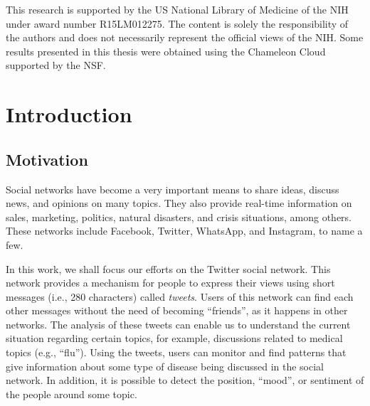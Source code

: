 \documentclass[12pt]{report}
\begin{document}
	This research is supported by the \ac{US} National Library of Medicine of the \ac{NIH} under award number R15LM012275. The content is solely the responsibility of the authors and does not necessarily represent the official views of the \ac{NIH}. Some results presented in this thesis were obtained using the Chameleon Cloud supported by the \ac{NSF}.
	\vfill
	\doublespacing
	
	\tableofcontents{}
	
	\newpage
	\printacronyms[include-classes=abbrev,name=List of Abbreviations]
	\newpage
	\listoffigures{}
	\newpage
	\listoftables{}
	
	\newpage
	
	\fancyhf{}
	\fancyhead[R]{\thepage} 
	\renewcommand{\figurename}{Fig}
	\onehalfspacing
	\chapter{Introduction}\label{Chapter 1}
	\doublespacing
	
	\section{Motivation}
	Social networks have become a very important means to share ideas, discuss news, and opinions on many topics.  They also provide real-time information on sales, marketing, politics, natural disasters, and crisis situations, among others. These networks include Facebook, Twitter, WhatsApp, and Instagram, to name a few. 
	
	In this work, we shall focus our efforts on the Twitter social network. This network provides a mechanism for people to express their views using short messages (i.e., 280 characters)
	called {\em tweets}. 
	Users of this network can find each other messages without the need of becoming ``friends'', as it happens in other networks. The analysis of these tweets can enable us to understand the current situation regarding certain topics, for example, discussions related to medical topics (e.g., ``flu'').
	Using the tweets, users can monitor and find patterns that give information about some type of disease being discussed in the social network. In addition, it is possible to detect the position,
	``mood'', or sentiment of the people around some topic.
\end{document}
